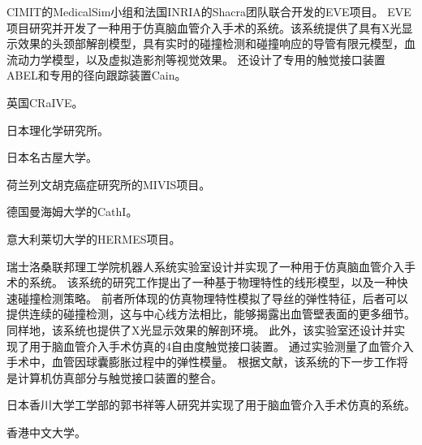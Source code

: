 CIMIT的MedicalSim小组\cite{medicalsimweb}和法国INRIA的Shacra团队\cite{shacraweb}联合开发的EVE项目\cite{Luboz2005MedicalSim}\cite{Wu2005MedicalSim}\cite{Cotin2005EVE}\cite{Duriez2006EVE}\cite{Lenoir2006EVE}\cite{Wu2007EVE}\cite{dequidt2007}。
EVE项目研究并开发了一种用于仿真脑血管介入手术的系统。该系统提供了具有X光显示效果的头颈部解剖模型\cite{Luboz2005MedicalSim}，具有实时的碰撞检测和碰撞响应的导管有限元模型\cite{Duriez2006EVE}，血流动力学模型\cite{Wu2007EVE}，以及虚拟造影剂等视觉效果。
还设计了专用的触觉接口装置ABEL和专用的径向跟踪装置Cain\cite{medicalsimweb}。

英国CRaIVE\cite{Coles2010CRaIVE}\cite{Coles2011CRaIVE}\cite{Coles2009CRaIVE}\cite{Luboz2008CRaIVE}\cite{luboz2009CRaIVE}\cite{Luboz2010CRaIVE}\cite{Luboz2009aCRaIVE}\cite{Wu2011MedicalSim}。

日本理化学研究所\cite{takashima2009RIKEN}\cite{takashima2007RIKEN}。

日本名古屋大学\cite{Arai1996Nagoya}\cite{Ikeda2005Nagoya}。

荷兰列文胡克癌症研究所的MIVIS项目\cite{Konings2003NKI}\cite{alderliesten2002NKI}\cite{alderliesten2004NKI}\cite{alderliesten2007NKI}\cite{alderliesten2007aNKI}\cite{Bosman2005NKI}。

德国曼海姆大学的CathI\cite{rebholz2004cathi}\cite{hofer2002cathi}。

意大利莱切大学的HERMES项目\cite{aloisio2006HERMES}\cite{aloisio2004HERMES}\cite{aloisio2006aHERMES}\cite{aloisio2005HERMES}。

瑞士洛桑联邦理工学院机器人系统实验室设计并实现了一种用于仿真脑血管介入手术的系统\cite{Wang2007EPFL}\cite{Ilic2005EPFL}\cite{Moix2005EPFL}\cite{Ilic2005aEPFL}\cite{Ilic2005bEPFL}。
该系统的研究工作提出了一种基于物理特性的线形模型，以及一种快速碰撞检测策略\cite{Wang2007EPFL}。
前者所体现的仿真物理特性模拟了导丝的弹性特征，后者可以提供连续的碰撞检测，这与中心线方法相比，能够揭露出血管壁表面的更多细节。
同样地，该系统也提供了X光显示效果的解剖环境。
此外，该实验室还设计并实现了用于脑血管介入手术仿真的4自由度触觉接口装置\cite{Ilic2005EPFL}\cite{Moix2005EPFL}\cite{Ilic2005aEPFL}。
通过实验测量了血管介入手术中，血管因球囊膨胀过程中的弹性模量\cite{Ilic2005bEPFL}。
根据文献\cite{Wang2007EPFL}，该系统的下一步工作将是计算机仿真部分与触觉接口装置的整合。

日本香川大学工学部的郭书祥等人研究并实现了用于脑血管介入手术仿真的系统\cite{Gao2012GUO}\cite{Gao2012aGUO}\cite{Gao2012bGUO}。

香港中文大学\cite{cuhkweb}\cite{guo2007CUHK}\cite{Chui2010CUHK}。




